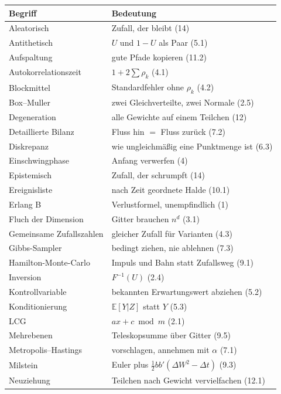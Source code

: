 \begin{merksatz}
\begin{center}
{\small
\renewcommand{\arraystretch}{1.3}
\begin{longtable}{@{}P{3.6cm}P{5.0cm}@{}}
\toprule
\textbf{Begriff} & \textbf{Bedeutung}\\
\midrule
\endhead
Aleatorisch & Zufall, der bleibt (14)\\
Antithetisch & $U$ und $1-U$ als Paar (5.1)\\
Aufspaltung & gute Pfade kopieren (11.2)\\
Autokorrelationszeit & $1+2\sum\rho_k$ (4.1)\\
Blockmittel & Standardfehler ohne $\rho_k$ (4.2)\\
Box--Muller & zwei Gleichverteilte, zwei Normale (2.5)\\
Degeneration & alle Gewichte auf einem Teilchen (12)\\
Detaillierte Bilanz & Fluss hin $=$ Fluss zurück (7.2)\\
Diskrepanz & wie ungleichmäßig eine Punktmenge ist (6.3)\\
Einschwingphase & Anfang verwerfen (4)\\
Epistemisch & Zufall, der schrumpft (14)\\
Ereignisliste & nach Zeit geordnete Halde (10.1)\\
Erlang B & Verlustformel, unempfindlich (1)\\
Fluch der Dimension & Gitter brauchen $n^{d}$ (3.1)\\
Gemeinsame Zufallszahlen & gleicher Zufall für Varianten (4.3)\\
Gibbs-Sampler & bedingt ziehen, nie ablehnen (7.3)\\
Hamilton-Monte-Carlo & Impuls und Bahn statt Zufallsweg (9.1)\\
Inversion & $F^{-1}(U)$ (2.4)\\
Kontrollvariable & bekannten Erwartungswert abziehen (5.2)\\
Konditionierung & $\mathbb E[Y|Z]$ statt $Y$ (5.3)\\
LCG & $ax+c \bmod m$ (2.1)\\
Mehrebenen & Teleskopsumme über Gitter (9.5)\\
Metropolis--Hastings & vorschlagen, annehmen mit $\alpha$ (7.1)\\
Milstein & Euler plus $\tfrac12 bb'(\Delta W^2-\Delta t)$ (9.3)\\
Neuziehung & Teilchen nach Gewicht vervielfachen (12.1)\\

\end{longtable}}
\end{center}
\end{merksatz}
